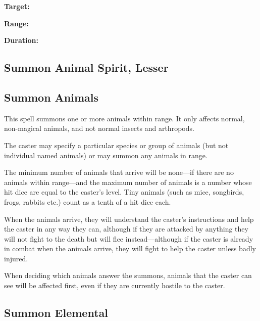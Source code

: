 \begin{multicols*}{2}
{\textbf{Target:}

\textbf{Range:}

\textbf{Duration:} }


\subsection{Summon Animal Spirit, Lesser}\label{spell:Summon Animal Spirit, Lesser}


\subsection{Summon Animals}\label{spell:Summon Animals}

This spell summons one or more animals within range. It only affects normal, non-magical animals, and not normal insects and arthropods.

The caster may specify a particular species or group of animals (but not individual named animals) or may summon any animals in range.

The minimum number of animals that arrive will be none—if there are no animals within range—and the maximum number of animals is a number whose hit dice are equal to the caster’s level. Tiny animals (such as mice, songbirds, frogs, rabbits etc.) count as a tenth of a hit dice each.

When the animals arrive, they will understand the caster’s instructions and help the caster in any way they can, although if they are attacked by anything they will not fight to the death but will flee instead—although if the caster is already in combat when the animals arrive, they will fight to help the caster unless badly injured.

When deciding which animals answer the summons, animals that the caster can see will be affected first, even if they are currently hostile to the caster.

\subsection{Summon Elemental}\label{spell:Summon Elemental}
\end{multicols*}
